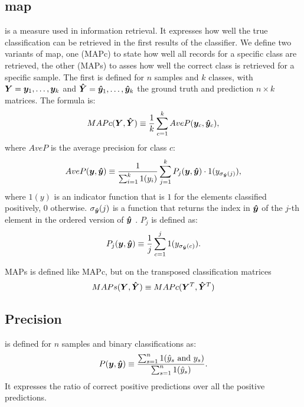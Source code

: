 \subsection{\acf{map}} is a measure used in information
retrieval. It expresses how well the true classification can be retrieved in
the first results of the classifier. We define two variants of
\ac{map}, one (MAPc) to state how well all records for a specific class are
retrieved, the other (MAPs) to asses how well the correct class is retrieved
for a specific sample. The first is defined for $n$ samples and $k$ classes,
with $\bm{Y}=\bm{y}_1,\dots,\bm{y}_k$ and $\bm{\hat
  Y}=\bm{\hat y}_1,\dots,\bm{\hat y}_k$ the ground truth and
prediction $n\times k$ matrices. The formula is:
\begin{equation*}
  MAPc(\bm{Y}, \bm{\hat Y})\equiv
  \frac{1}{k}\sum_{c=1}^{k}AveP(\bm{y}_c, \bm{\hat y}_c),
\end{equation*}
where $AveP$ is the average precision for class $c$:
\begin{equation*}
  AveP(\bm{y}, \bm{\hat y}) \equiv
  \frac{1}{\sum_{i=1}^k 1(y_i)}\sum_{j=1}^k P_j(\bm{y}, \bm{\hat y})\cdot 1(y_{\sigma_{\bm{\hat y}}(j)}),
\end{equation*}
where $1(y)$ is an indicator
function that is $1$ for the elements classified positively, $0$
otherwise. $\sigma_{\bm{\hat y}}(j)$ is a function that returns the
  index in $\bm{\hat y}$ of the $j$-th element in the ordered
  version of $\bm{\hat y}$ . $P_j$ is defined as:
\begin{equation*}
P_j(\bm{y}, \bm{\hat y}) \equiv \frac{1}{j}\sum_{c=1}^j
1(y_{\sigma_{\bm{\hat y}}(c)}).
\end{equation*}

MAPs is defined like MAPc, but on the transposed classification
matrices
\begin{equation*}
  MAPs(\bm{Y}, \bm{\hat Y})\equiv
  MAPc(\bm{Y}^T, \bm{\hat Y}^T)
\end{equation*}

\subsection{Precision} is defined for $n$ samples and binary
classifications as:
\begin{equation}\label{eq:precision}
P(\bm{y}, \bm{\hat y}) \equiv \frac{\sum_{s=1}^n 1(\hat
  y_s \text{ and }y_s)}{\sum_{s=1}^n 1(\hat y_s)}.
\end{equation}
It expresses the ratio of correct positive predictions over all the
positive predictions.

